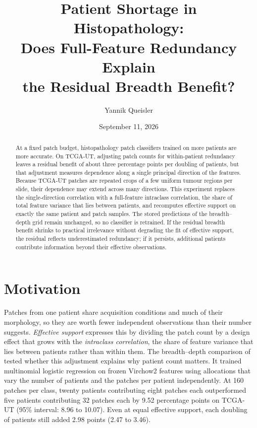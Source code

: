 \documentclass[11pt]{article}
\title{Patient Shortage in Histopathology:\\Does Full-Feature Redundancy Explain\\the Residual Breadth Benefit?}
\author{Yannik Queisler}
\date{September 11, 2026}
\begin{document}
\raggedbottom
{}
\setlength{\emergencystretch}{2em}
\maketitle
\begin{abstract}
\noindent At a fixed patch budget, histopathology patch classifiers trained on more patients are more accurate. On TCGA-UT, adjusting patch counts for within-patient redundancy leaves a residual benefit of about three percentage points per doubling of patients, but that adjustment measures dependence along a single principal direction of the features. Because TCGA-UT patches are repeated crops of a few uniform tumour regions per slide, their dependence may extend across many directions. This experiment replaces the single-direction correlation with a full-feature intraclass correlation, the share of total feature variance that lies between patients, and recomputes effective support on exactly the same patient and patch samples. The stored predictions of the breadth--depth grid remain unchanged, so no classifier is retrained. If the residual breadth benefit shrinks to practical irrelevance without degrading the fit of effective support, the residual reflects underestimated redundancy; if it persists, additional patients contribute information beyond their effective observations.
\end{abstract}
\setcounter{tocdepth}{1}
\tableofcontents
\clearpage

\section{Motivation}
\label{sec:motivation}
Patches from one patient share acquisition conditions and much of their morphology, so they are worth fewer independent observations than their number suggests. \emph{Effective support} expresses this by dividing the patch count by a design effect that grows with the \emph{intraclass correlation}, the share of feature variance that lies between patients rather than within them. The breadth--depth comparison of \citet{queisler2026effectiveSupport} tested whether this adjustment explains why patient count matters. It trained multinomial logistic regression on frozen Virchow2 features using allocations that vary the number of patients and the patches per patient independently. At 160 patches per class, twenty patients contributing eight patches each outperformed five patients contributing 32 patches each by 9.52 percentage points on TCGA-UT (95\% interval: 8.96 to 10.07). Even at equal effective support, each doubling of patients still added 2.98 points (2.47 to 3.46).
\end{document}
